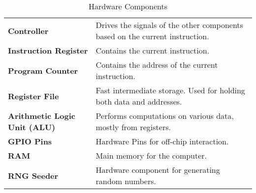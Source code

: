 \newcommand{\hw}[2]{%
	\textbf{#1} & #2 \\%
	\hline%
}
\begin{table}[H]
	\begin{tabularx}{\textwidth}{| a | x |}
		\hline
		 &  \\
		\hline
		\hw{Controller}{Drives the signals of the other components based on the current instruction.}
		\hw{Instruction Register}{Contains the current instruction.}
		\hw{Program Counter}{Contains the address of the current instruction.}
		\hw{Register File}{Fast intermediate storage. Used for holding both data and addresses.}
		\hw{Arithmetic Logic Unit (ALU)}{Performs computations on various data, mostly from registers.}
		\hw{GPIO Pins}{Hardware Pins for off-chip interaction.}
		\hw{RAM}{Main memory for the computer.}
		\hw{RNG Seeder}{Hardware component for generating random numbers.}
	\end{tabularx}
	\label{Tab:hardware}
	\caption{Hardware Components}
\end{table}

